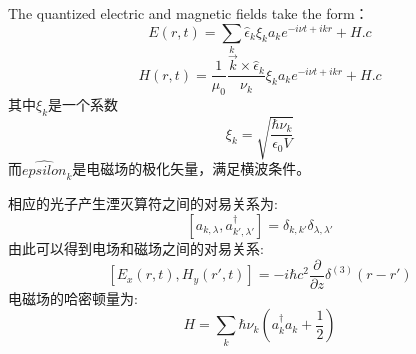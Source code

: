 The quantized electric and magnetic fields take the form：
\[E(r,t)=\sum_k \hat{\epsilon}_k\xi_ka_ke^{-i\nu t+ikr}+H.c \]
\[H(r,t)=\frac{1}{\mu_0}\frac{\vec{k}\times\hat{\epsilon}_k}{\nu_k}\xi_ka_ke^{-i\nu t+ikr}+H.c\]
其中$\xi_k$是一个系数
\[\xi_k=\sqrt{\frac{\hbar \nu_k}{\epsilon_0 V}}\]
而$\hat{epsilon}_k$是电磁场的极化矢量，满足横波条件。\par
相应的光子产生湮灭算符之间的对易关系为:
\[[a_{k,\lambda},a_{k',\lambda'}^\dagger]=\delta_{k,k'}\delta_{\lambda,\lambda'}\]
由此可以得到电场和磁场之间的对易关系:
\[[E_x(r,t),H_y(r',t)]=-i\hbar c^2\frac{\partial}{\partial z}\delta^{(3)}(r-r')\]
电磁场的哈密顿量为:
\[H=\sum_k\hbar \nu_k(a_k^\dagger a_k+\frac{1}{2})\]